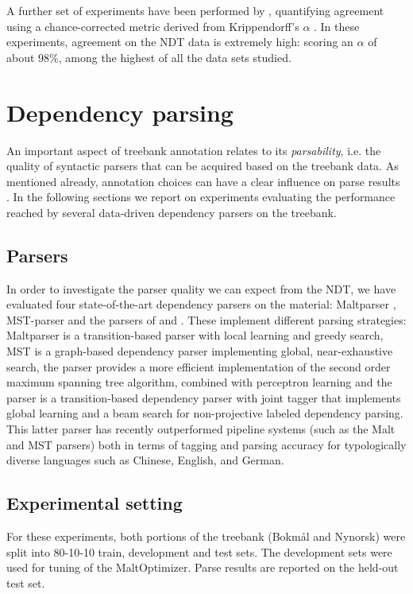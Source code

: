 \documentclass[10pt,a4paper]{article}
\begin{document}
A further set of experiments have been performed by ,
quantifying agreement using a chance-corrected metric derived from
Krippendorff's $\alpha$ \cite{Krippendorff:12}. In these experiments,
agreement on the NDT data is extremely high: scoring an $\alpha$ of about
98\%, among the highest of all the data sets studied.

\section{Dependency parsing}
An important aspect of treebank annotation relates to its
\emph{parsability}, i.e. the quality of syntactic parsers that can be
acquired based on the treebank data. As mentioned already, annotation
choices can have a clear influence on parse results
\cite{Sch:Abe:Rap:12}. In the following sections we report on experiments evaluating the performance reached by several data-driven dependency parsers on the treebank.
 
\subsection{Parsers}
In order to investigate the parser quality we
can expect from the NDT, we have evaluated four state-of-the-art
dependency parsers on the material: Maltparser \cite{Niv:Hal:Nil:06},
MST-parser \cite{McD:Per:Rib:Haj:05} and the parsers of
 and . These implement different
parsing strategies: Maltparser is a transition-based parser with local
learning and greedy search, MST is a graph-based dependency parser
implementing global, near-exhaustive search, the 
parser provides a more efficient implementation of the second order
maximum spanning tree algorithm, combined with perceptron learning and
the  parser is a transition-based dependency
parser with joint tagger that implements global learning and a beam
search for non-projective labeled dependency parsing.  This latter
parser has recently outperformed pipeline systems (such as the Malt
and MST parsers) both in terms of tagging and parsing accuracy for
typologically diverse languages such as Chinese, English, and German.

\subsection{Experimental setting}
For these experiments, both portions of the treebank (Bokm{\aa}l and
Nynorsk) were split into 80-10-10 train, development and test sets. The development sets were used for tuning of the MaltOptimizer. Parse results are reported on the held-out test set.
\end{document}
